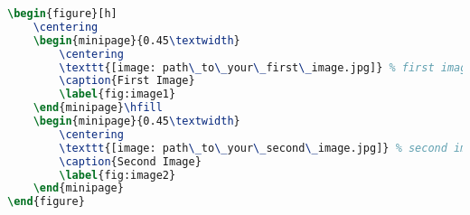 \begin{lstlisting}[language=TeX]
\begin{figure}[h]
    \centering
    \begin{minipage}{0.45\textwidth}
        \centering
        \texttt{[image: path\_to\_your\_first\_image.jpg]} % first image
        \caption{First Image}
        \label{fig:image1}
    \end{minipage}\hfill
    \begin{minipage}{0.45\textwidth}
        \centering
        \texttt{[image: path\_to\_your\_second\_image.jpg]} % second image
        \caption{Second Image}
        \label{fig:image2}
    \end{minipage}
\end{figure}
\end{lstlisting}
